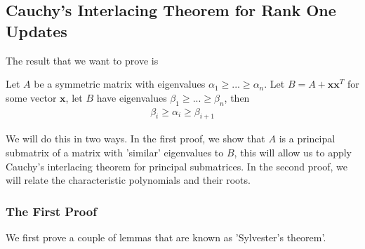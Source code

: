 \documentclass{math}
\renewcommand{\vec}[1]{\boldsymbol{#1}}
\begin{document}
\subsection{Cauchy's Interlacing Theorem for Rank One Updates}

The result that we want to prove is

\begin{theorem}\label{thm:cauchy-rank-one}
    Let $A$ be a symmetric matrix with eigenvalues $\alpha_1 \geq ... \geq \alpha_n$.
    Let $B = A + \vec{x} \vec{x}^T$ for some vector $\vec{x}$, let $B$ have eigenvalues $\beta_1 \geq ... \geq \beta_n$, then
    \begin{align*}
        \beta_i \geq \alpha_i \geq \beta_{i + 1}
    \end{align*}
\end{theorem}

We will do this in two ways. In the first proof, we show that $A$ is a principal submatrix of a matrix with 'similar' eigenvalues to $B$,
this will allow us to apply Cauchy's interlacing theorem for principal submatrices.
In the second proof, we will relate the characteristic polynomials and their roots.

\subsubsection{The First Proof}

We first prove a couple of lemmas that are known as 'Sylvester's theorem'.
\end{document}
